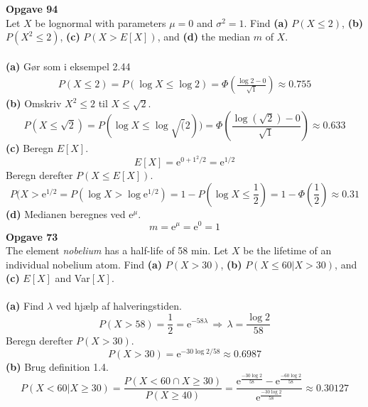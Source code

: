 \documentclass[12pt,a4paper,draft]{report}
\author{Frederik Appel Vardinghus-Nielsen}
\begin{document}
\noindent\textbf{Opgave 94}\\
Let $X$ be lognormal with parameters $\mu=0$ and $\sigma^2=1$. Find \textbf{(a)} $P(X\leq 2)$, \textbf{(b)} $P(X^2\leq 2)$, \textbf{(c)} $P(X>E[X])$, and \textbf{(d)} the median $m$ of $X$.\\\\
\textbf{(a)} Gør som i eksempel 2.44
\begin{align*}
P(X\leq 2)=P(\log X\leq \log 2)=\Phi\left(\frac{\log 2-0}{\sqrt{1}}\right)\approx 0.755
\end{align*}
\textbf{(b)} Omskriv $X^2\leq 2$ til $X\leq \sqrt{2}$.
\begin{equation}
P(X\leq\sqrt{2})=P(\log X\leq\log \sqrt(2))=\Phi\left(\frac{\log(\sqrt{2})-0}{\sqrt{1}}\right)\approx 0.633
\end{equation}
\textbf{(c)} Beregn $E[X]$.
\begin{equation}
E[X]=\mathrm{e}^{0+1^2/2}=\mathrm{e}^{1/2}
\end{equation}
Beregn derefter $P(X\leq E[X])$.
\begin{equation}
P(X> \mathrm{e}^{1/2}=P(\log X>\log\mathrm{e}^{1/2})=1-P(\log X\leq\frac{1}{2})=1-\Phi\left(\frac{1}{2}\right)\approx 0.31
\end{equation}
\textbf{(d)} Medianen beregnes ved $\mathrm{e}^{\mu}$.
\begin{equation}
m=\mathrm{e}^{\mu}=\mathrm{e}^0=1
\end{equation}
\textbf{Opgave 73}\\
The element \textit{nobelium} has a half-life of 58 min. Let $X$ be the lifetime of an individual nobelium atom. Find \textbf{(a)} $P(X>30)$, \textbf{(b)} $P(X\leq 60|X>30)$, and \textbf{(c)} $E[X]$ and Var$[X]$.\\\\
\textbf{(a)} Find $\lambda$ ved hjælp af halveringstiden.
\begin{equation}
P(X>58)=\frac{1}{2}=\mathrm{e}^{-58\lambda}\,\Rightarrow\,\lambda=\frac{\log 2}{58}
\end{equation}
Beregn derefter $P(X>30)$.
\begin{equation}
P(X>30)=\mathrm{e}^{-30\log2/58}\approx 0.6987
\end{equation}
\textbf{(b)} Brug definition 1.4.
\begin{equation}
P(X<60|X\geq30)=\frac{P(X<60\cap X\geq30)}{P(X\geq40)}=\frac{\mathrm{e}^{\frac{-30\log2}{58}}-\mathrm{e}^{\frac{-60\log2}{58}}}{\mathrm{e}^{\frac{-30\log2}{58}}}\approx0.30127
\end{equation}
\end{document}
